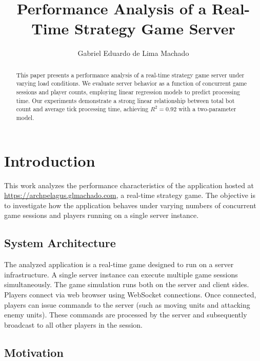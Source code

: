 \documentclass[acmsmall]{acmart}
\begin{document}
\title{Performance Analysis of a Real-Time Strategy Game Server}

\author{Gabriel Eduardo de Lima Machado}

\begin{abstract}
  This paper presents a performance analysis of a real-time strategy game server under varying load conditions. We evaluate server behavior as a function of concurrent game sessions and player counts, employing linear regression models to predict processing time. Our experiments demonstrate a strong linear relationship between total bot count and average tick processing time, achieving $R^2=0.92$ with a two-parameter model.
\end{abstract}


\maketitle

\section{Introduction}

This work analyzes the performance characteristics of the application hosted at \url{https://archpelagus.glmachado.com}, a real-time strategy game. The objective is to investigate how the application behaves under varying numbers of concurrent game sessions and players running on a single server instance.

\subsection{System Architecture}

The analyzed application is a real-time game designed to run on a server infrastructure. A single server instance can execute multiple game sessions simultaneously. The game simulation runs both on the server and client sides. Players connect via web browser using WebSocket connections. Once connected, players can issue commands to the server (such as moving units and attacking enemy units). These commands are processed by the server and subsequently broadcast to all other players in the session.

\subsection{Motivation}
\end{document}
